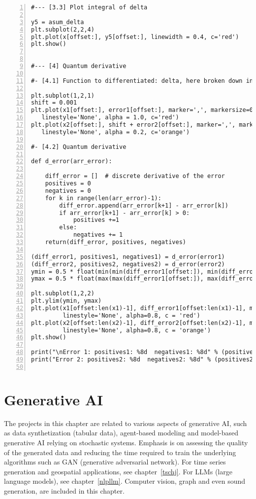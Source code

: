 \documentclass[oneside,10pt]{book}
\begin{document}
\begin{lstlisting}[numbers=left]
#--- [3.3] Plot integral of delta

y5 = asum_delta
plt.subplot(2,2,4)
plt.plot(x[offset:], y5[offset:], linewidth = 0.4, c='red')
plt.show()


#--- [4] Quantum derivative

#- [4.1] Function to differentiated: delta, here broken down into 2 legs

plt.subplot(1,2,1)
shift = 0.001
plt.plot(x1[offset:], error1[offset:], marker=',', markersize=0.1, 
   linestyle='None', alpha = 1.0, c='red')
plt.plot(x2[offset:], shift + error2[offset:], marker=',', markersize=0.1, 
   linestyle='None', alpha = 0.2, c='orange')

#- [4.2] Quantum derivative

def d_error(arr_error):

    diff_error = []  # discrete derivative of the error
    positives = 0
    negatives = 0
    for k in range(len(arr_error)-1):
        diff_error.append(arr_error[k+1] - arr_error[k])
        if arr_error[k+1] - arr_error[k] > 0: 
            positives +=1
        else:
            negatives += 1
    return(diff_error, positives, negatives)

(diff_error1, positives1, negatives1) = d_error(error1)
(diff_error2, positives2, negatives2) = d_error(error2)
ymin = 0.5 * float(min(min(diff_error1[offset:]), min(diff_error1[offset:])))
ymax = 0.5 * float(max(max(diff_error1[offset:]), max(diff_error2[offset:])))

plt.subplot(1,2,2)
plt.ylim(ymin, ymax)
plt.plot(x1[offset:len(x1)-1], diff_error1[offset:len(x1)-1], marker=',', markersize=0.1, 
         linestyle='None', alpha=0.8, c = 'red')
plt.plot(x2[offset:len(x2)-1], diff_error2[offset:len(x2)-1], marker=',', markersize=0.1, 
         linestyle='None', alpha=0.8, c = 'orange')
plt.show()

print("\nError 1: positives1: %8d  negatives1: %8d" % (positives1, negatives1)) 
print("Error 2: positives2: %8d  negatives2: %8d" % (positives2, negatives2)) 


\end{lstlisting}


\chapter{Generative AI}

The projects in this chapter are related to various aspects of generative AI, such as data synthetization (tabular data), agent-based modeling and model-based generative AI relying on stochastic systems. Emphasis is on assessing the quality of the generated data and reducing the time required to train the underlying algorithms such as GAN (generative adversarial network). For time series generation and geospatial applications, see chapter~\ref{tschj}. 
For LLMs (large language models), see chapter~\ref{nlpllm}.  Computer vision, graph and even sound generation, are included in this chapter.
   
\end{document}
